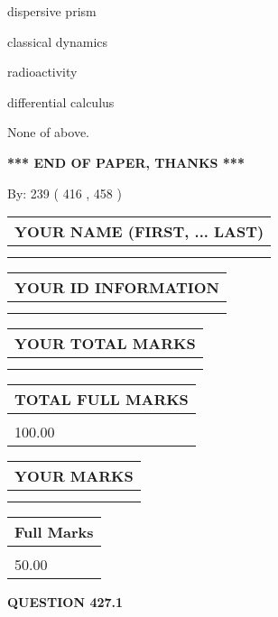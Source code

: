 \documentclass[12pt]{article}
\begin{document}
 
dispersive prism
 
 
classical dynamics
 
 
radioactivity
 
 
differential calculus
 
 
 None of above.
 
 
   
   
\vspace{1.0in} 
{\textbf{\large{ *** END OF PAPER, THANKS *** }}} 
   
   
\hspace{1.0in} By: 
 239 ( 416 ,  458 )
   
   
   
   
\newpage 
\setcounter{page}{ 
   427001 } 
   
   
   
   
\noindent\begin{tabular}{|l|}
\hline
YOUR NAME (FIRST, ... LAST)  \\
\hline
 \\ 
 \\ 
\hline
\end{tabular}
\hspace{0.05in} \begin{tabular}{|l|}
\hline
 YOUR   ID   INFORMATION  \\
\hline
 \\ 
 \\ 
\hline
\end{tabular}
   
   
\vspace{0.2in}\noindent\begin{tabular}{|l|}
\hline
YOUR TOTAL MARKS  \\
\hline
 \\ 
 \\ 
\hline
\end{tabular}
\hspace{0.05in} \begin{tabular}{|l|}
\hline
TOTAL FULL MARKS  \\
\hline
 \\ 
100.00 \\
\hline
\end{tabular}
  
\vspace{0.2in}
  
\noindent\begin{tabular}{|l|}
\hline
 YOUR MARKS  \\
\hline
 \\ 
 \\ 
\hline
\end{tabular}
\hspace{0.05in} \begin{tabular}{|l|}
\hline
 Full Marks  \\
\hline
 \\ 
50.00 \\
\hline
\end{tabular}
{\textbf{\Large{QUESTION
427.1 
}}}
  
\end{document}
